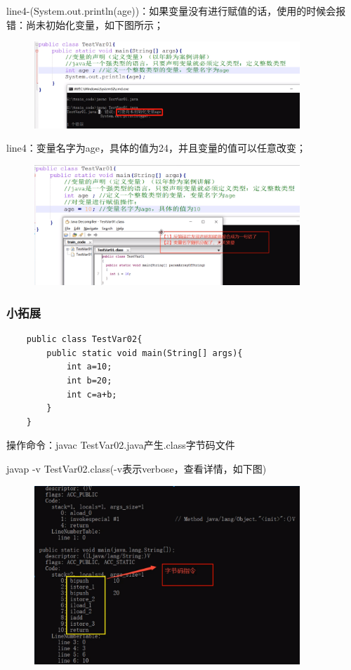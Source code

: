 \documentclass{article}
\begin{document}
	line4-(System.out.println(age))：如果变量没有进行赋值的话，使用的时候会报错：尚未初始化变量，如下图所示；
	
	\begin{figure}[ht]
		\centering
		\includegraphics[width=100mm]{02.png}
		\label{fig:label}
	\end{figure}
	
	line4：变量名字为age，具体的值为24，并且变量的值可以任意改变；
	
	
	\begin{figure}[ht]
		\centering
		\includegraphics[width=100mm]{03.png}
		\label{fig:label}
	\end{figure}
	
	\subsubsection{小拓展}
	
	\begin{lstlisting}
	public class TestVar02{
	    public static void main(String[] args){
	        int a=10;
	        int b=20;
	        int c=a+b;
	    }
	}
	\end{lstlisting}
	
	操作命令：javac TestVar02.java产生.class字节码文件
	
	\setlength{\parindent}{7em}javap -v TestVar02.class(-v表示verbose，查看详情，如下图)
	
	\begin{figure}[ht]
		\centering
		\includegraphics[width=100mm]{04.png}
		\label{fig:label}
	\end{figure}
	
\end{document}
